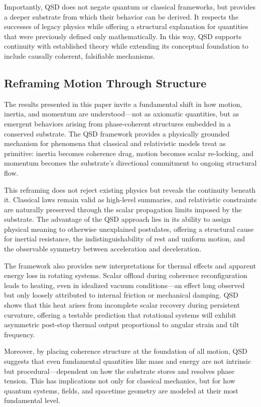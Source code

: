 \documentclass[entropy,article,submit,pdftex,moreauthors]{Definitions/mdpi}
\begin{document}
Importantly, QSD does not negate quantum or classical frameworks, but provides a deeper substrate from which their behavior can be derived. It respects the successes of legacy physics while offering a structural explanation for quantities that were previously defined only mathematically. In this way, QSD supports continuity with established theory while extending its conceptual foundation to include causally coherent, falsifiable mechanisms.
\subsection{Reframing Motion Through Structure}

The results presented in this paper invite a fundamental shift in how motion, inertia, and momentum are understood—not as axiomatic quantities, but as emergent behaviors arising from phase-coherent structures embedded in a conserved substrate. The QSD framework provides a physically grounded mechanism for phenomena that classical and relativistic models treat as primitive: inertia becomes coherence drag, motion becomes scalar re-locking, and momentum becomes the substrate’s directional commitment to ongoing structural flow.

This reframing does not reject existing physics but reveals the continuity beneath it. Classical laws remain valid as high-level summaries, and relativistic constraints are naturally preserved through the scalar propagation limits imposed by the substrate. The advantage of the QSD approach lies in its ability to assign physical meaning to otherwise unexplained postulates, offering a structural cause for inertial resistance, the indistinguishability of rest and uniform motion, and the observable symmetry between acceleration and deceleration.

The framework also provides new interpretations for thermal effects and apparent energy loss in rotating systems. Scalar offload during coherence reconfiguration leads to heating, even in idealized vacuum conditions—an effect long observed but only loosely attributed to internal friction or mechanical damping. QSD shows that this heat arises from incomplete scalar recovery during persistent curvature, offering a testable prediction that rotational systems will exhibit asymmetric post-stop thermal output proportional to angular strain and tilt frequency.

Moreover, by placing coherence structure at the foundation of all motion, QSD suggests that even fundamental quantities like mass and energy are not intrinsic but procedural—dependent on how the substrate stores and resolves phase tension. This has implications not only for classical mechanics, but for how quantum systems, fields, and spacetime geometry are modeled at their most fundamental level.
\end{document}
